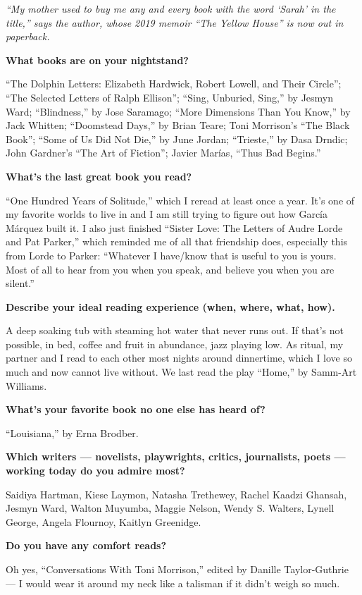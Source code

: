 \emph{``My mother used to buy me any and every book with the word
`Sarah' in the title,'' says the author, whose 2019 memoir ``The Yellow
House'' is now out in paperback.}

\textbf{What books are on your nightstand?}

``The Dolphin Letters: Elizabeth Hardwick, Robert Lowell, and Their
Circle''; ``The Selected Letters of Ralph Ellison''; ``Sing, Unburied,
Sing,'' by Jesmyn Ward; ``Blindness,'' by Jose Saramago; ``More
Dimensions Than You Know,'' by Jack Whitten; ``Doomstead Days,'' by
Brian Teare; Toni Morrison's ``The Black Book''; ``Some of Us Did Not
Die,'' by June Jordan; ``Trieste,'' by Dasa Drndic; John Gardner's ``The
Art of Fiction''; Javier Marías, ``Thus Bad Begins.''

\textbf{What's the last great book you read?}

``One Hundred Years of Solitude,'' which I reread at least once a year.
It's one of my favorite worlds to live in and I am still trying to
figure out how García Márquez built it. I also just finished ``Sister
Love: The Letters of Audre Lorde and Pat Parker,'' which reminded me of
all that friendship does, especially this from Lorde to Parker:
``Whatever I have/know that is useful to you is yours. Most of all to
hear from you when you speak, and believe you when you are silent.''

\textbf{Describe your ideal reading experience (when, where, what,
how).}

A deep soaking tub with steaming hot water that never runs out. If
that's not possible, in bed, coffee and fruit in abundance, jazz playing
low. As ritual, my partner and I read to each other most nights around
dinnertime, which I love so much and now cannot live without. We last
read the play ``Home,'' by Samm-Art Williams.

\textbf{What's your favorite book no one else has heard of?}

``Louisiana,'' by Erna Brodber.

\textbf{Which writers --- novelists, playwrights, critics, journalists,
poets --- working today do you admire most?}

Saidiya Hartman, Kiese Laymon, Natasha Trethewey, Rachel Kaadzi Ghansah,
Jesmyn Ward, Walton Muyumba, Maggie Nelson, Wendy S. Walters, Lynell
George, Angela Flournoy, Kaitlyn Greenidge.

\textbf{Do you have any comfort reads?}

Oh yes, ``Conversations With Toni Morrison,'' edited by Danille
Taylor-Guthrie --- I would wear it around my neck like a talisman if it
didn't weigh so much.

